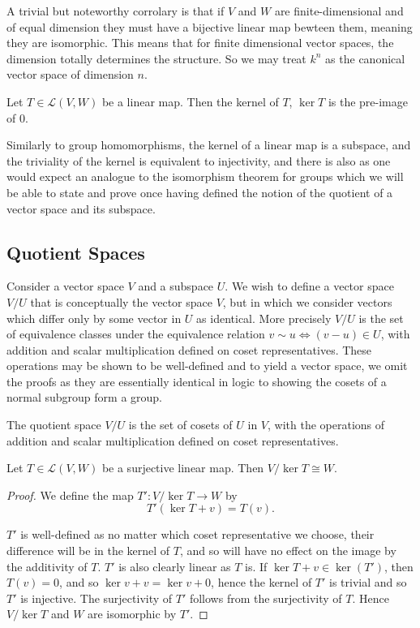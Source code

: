 \documentclass[]{article}
\begin{document}
A trivial but noteworthy corrolary is that if $V$ and $W$ are finite-dimensional and of equal dimension they must have a bijective linear map bewteen them, meaning they are isomorphic. This means that for finite dimensional vector spaces, the dimension totally determines the structure. So we may treat $k^n$ as the canonical vector space of dimension $n$.

\begin{defi} [Kernel]
		Let $T \in \mathcal{L}(V,W)$ be a linear map. Then the kernel of $T$, $\ker T$ is the pre-image of $0$.
\end{defi}

Similarly to group homomorphisms, the kernel of a linear map is a subspace, and the triviality of the kernel is equivalent to injectivity, and there is also as one would expect an analogue to the isomorphism theorem for groups which we will be able to state and prove once having defined the notion of the quotient of a vector space and its subspace.

\subsection{Quotient Spaces}

Consider a vector space $V$ and a subspace $U$. We wish to define a vector space $V / U$ that is conceptually the vector space $V$, but in which we consider vectors which differ only by some vector in $U$ as identical. More precisely $V / U$ is the set of equivalence classes under the equivalence relation $v \sim u \iff (v-u) \in U$, with addition and scalar multiplication defined on coset representatives. These operations may be shown to be well-defined and to yield a vector space, we omit the proofs as they are essentially identical in logic to showing the cosets of a normal subgroup form a group.

		\begin{defi} 
				The quotient space $V / U$ is the set of cosets of $U$ in $V$, with the operations of addition and scalar multiplication defined on coset representatives.
		\end{defi}

\begin{thm} 
		Let $T \in \mathcal{L}(V,W)$ be a surjective linear map. Then $V / \ker T \cong W$.
\end{thm}

\begin{proof}
		We define the map $T': V / \ker T \to W$ by
		\[
				T'(\ker T + v) = T(v)
		.\] 

		$T'$ is well-defined as no matter which coset representative we choose, their difference will be in the kernel of $T$, and so will have no effect on the image by the additivity of $T$. $T'$ is also clearly linear as $T$ is. If $\ker T + v \in \ker (T')$, then $T(v) = 0$, and so $\ker v + v = \ker v + 0$, hence the kernel of $T'$ is trivial and so $T'$ is injective. The surjectivity of $T'$ follows from the surjectivity of $T$. Hence $V / \ker T$ and $W$ are isomorphic by $T'$.
\end{proof}
\end{document}
